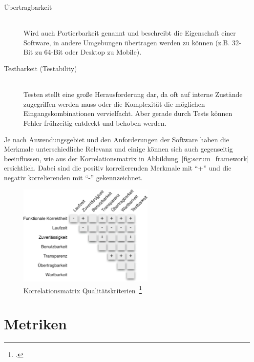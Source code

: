 \begin{description}
\begin{description}
    \item[Übertragbarkeit] \hfill \\ Wird auch Portierbarkeit genannt und beschreibt die Eigenschaft einer Software, in andere Umgebungen übertragen werden zu können (z.B. 32-Bit zu 64-Bit oder Desktop zu Mobile).
    \item[Testbarkeit (Testability)] \hfill \\ Testen stellt eine große Herausforderung dar, da oft auf interne Zustände zugegriffen werden muss oder die Komplexität die möglichen Eingangskombinationen vervielfacht. Aber gerade durch Tests können Fehler frühzeitig entdeckt und behoben werden.
  \end{description}
\end{description}

Je nach Anwendungsgebiet und den Anforderungen der Software haben die Merkmale unterschiedliche Relevanz und einige können sich auch gegenseitig beeinflussen, wie aus der Korrelationsmatrix in Abbildung~\ref{fig:scrum_framework} ersichtlich.
Dabei sind die positiv korrelierenden Merkmale mit ``+'' und die negativ korrelierenden mit ``-'' gekennzeichnet.

\begin{savenotes}
  \begin{figure}[H] 
    \centering
       \includegraphics[width=0.6\textwidth]{img/korrelationsmatrix-kriterien.png}
    \caption[Korrelationsmatrix Qualitätskriterien]{Korrelationsmatrix Qualitätskriterien~\footcite[][S. 11, Abb. 1.3]{hoffmann_software_qualitat_2013}}\label{fig:Korrelationsmatrix Qualitätskriterien}
  \end{figure}
\end{savenotes}

\newpage
\section{Metriken}

